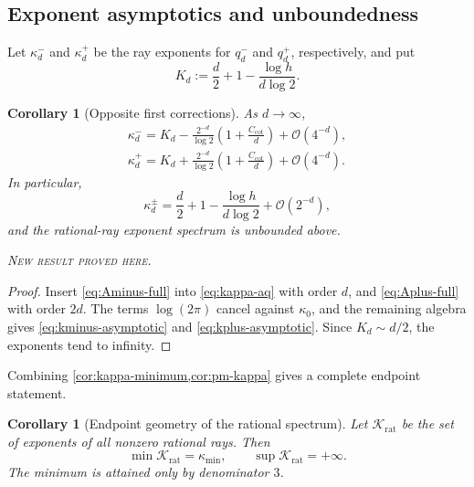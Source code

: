 \documentclass[11pt,oneside]{article}
\newtheorem{corollary}[theorem]{Corollary}
\theoremstyle{definition}
\theoremstyle{remark}
\newcommand{\bigO}{\mathcal O}
\newcommand{\newresult}{\textcolor{newgreen}{\textsc{New result proved here.}}}
\begin{document}
\subsection{Exponent asymptotics and unboundedness}

Let $\kappa_d^-$ and $\kappa_d^+$ be the ray exponents for $q_d^-$ and $q_d^+$,
respectively, and put
\begin{equation}
 K_d:=\frac d2+1-\frac{\log h}{d\log2}.
 \label{eq:Kd}
\end{equation}

\begin{corollary}[Opposite first corrections]\label{cor:pm-kappa}
As $d\to\infty$,
\begin{align}
 \boxed{
 \kappa_d^-=K_d-\frac{2^{-d}}{\log2}
 \left(1+\frac{C_{\cot}}d\right)+\bigO(4^{-d}),}
 \label{eq:kminus-asymptotic}\\
 \boxed{
 \kappa_d^+=K_d+\frac{2^{-d}}{\log2}
 \left(1+\frac{C_{\cot}}d\right)+\bigO(4^{-d}).}
 \label{eq:kplus-asymptotic}
\end{align}
In particular,
\begin{equation}
 \kappa_d^{\pm}=\frac d2+1-\frac{\log h}{d\log2}+\bigO(2^{-d}),
 \label{eq:kpm-main}
\end{equation}
and the rational-ray exponent spectrum is unbounded above.

\smallskip\noindent\newresult
\end{corollary}

\begin{proof}
Insert \eqref{eq:Aminus-full} into \eqref{eq:kappa-aq} with order $d$, and
\eqref{eq:Aplus-full} with order $2d$. The terms $\log(2\pi)$ cancel against
$\kappa_0$, and the remaining algebra gives \eqref{eq:kminus-asymptotic} and
\eqref{eq:kplus-asymptotic}. Since $K_d\sim d/2$, the exponents tend to infinity.
\end{proof}

Combining \cref{cor:kappa-minimum,cor:pm-kappa} gives a complete endpoint statement.

\begin{corollary}[Endpoint geometry of the rational spectrum]\label{cor:spectrum-endpoints}
Let $\mathcal K_{\mathrm{rat}}$ be the set of exponents of all nonzero rational
rays. Then
\begin{equation}
 \min\mathcal K_{\mathrm{rat}}=\kappa_{\min},
 \qquad
 \sup\mathcal K_{\mathrm{rat}}=+\infty.
 \label{eq:spectrum-endpoints}
\end{equation}
The minimum is attained only by denominator $3$.
\end{corollary}
\end{document}
